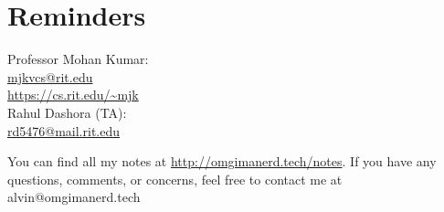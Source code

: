 \documentclass[letterpaper, 12pt]{math}
\begin{document}
\section*{Reminders}
Professor Mohan Kumar: \\
\url{mjkvcs@rit.edu} \\
\url{https://cs.rit.edu/~mjk} \\

\noindent Rahul Dashora (TA): \\
\url{rd5476@mail.rit.edu} \\

\begin{center}
  You can find all my notes at \url{http://omgimanerd.tech/notes}. If you have
  any questions, comments, or concerns, feel free to contact me at
  alvin@omgimanerd.tech
\end{center}
\end{document}
